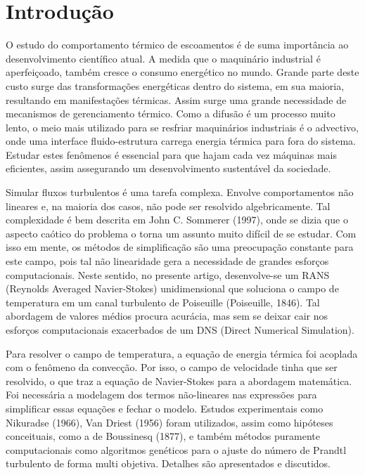 \chapter{Introdução}

\noindent 

 
 	O estudo do comportamento térmico de escoamentos é de suma importância ao desenvolvimento científico atual. A medida que o maquinário industrial é aperfeiçoado, também cresce o consumo energético no mundo. Grande parte deste custo surge das transformações energéticas dentro do sistema, em sua maioria, resultando em manifestações térmicas. Assim surge uma grande necessidade de mecanismos de gerenciamento térmico. Como a difusão é um processo muito lento, o meio mais utilizado para se resfriar maquinários industriais é o advectivo, onde uma interface fluido-estrutura carrega energia térmica para fora do sistema. Estudar estes fenômenos é essencial para que hajam cada vez máquinas mais eficientes, assim assegurando um desenvolvimento sustentável da sociedade. 
 	
	Simular fluxos turbulentos é uma tarefa complexa. Envolve comportamentos não lineares e, na maioria dos casos, não pode ser resolvido algebricamente. Tal complexidade é bem descrita em John C. Sommerer (1997), onde se dizia que o aspecto caótico do problema o torna um assunto muito difícil de se estudar. Com isso em mente, os métodos de simplificação são uma preocupação constante para este campo, pois tal não linearidade gera a necessidade de grandes esforços computacionais.
	Neste sentido, no presente artigo, desenvolve-se um RANS (Reynolds Averaged Navier-Stokes) unidimensional que soluciona o campo de temperatura em um canal turbulento de Poiseuille (Poiseuille, 1846). Tal abordagem de valores médios procura acurácia, mas sem se deixar cair nos esforços computacionais exacerbados de um DNS (Direct Numerical Simulation).
	
	Para resolver o campo de temperatura, a equação de energia térmica foi acoplada com o fenômeno da convecção. Por isso, o campo de velocidade tinha que ser resolvido, o que traz a equação de Navier-Stokes para a abordagem matemática. Foi necessária a modelagem dos termos não-lineares nas expressões para simplificar essas equações e fechar o modelo.
	Estudos experimentais como Nikuradse (1966), Van Driest (1956) foram utilizados, assim como hipóteses conceituais, como a de Boussinesq (1877), e também métodos puramente computacionais como algoritmos genéticos para o ajuste do número de Prandtl turbulento de forma multi objetiva. 
	Detalhes são apresentados e discutidos.
	
